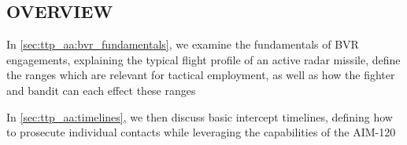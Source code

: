 \clearpage

\subsection{OVERVIEW}
\begin{tcoloritemize}
    \blueitem[Fundamentals] 
    In \cref{sec:ttp_aa:bvr_fundamentals}, 
    we examine the fundamentals of BVR engagements, 
    explaining the typical flight profile of an active radar missile,
    define the ranges which are relevant for tactical employment,
    as well as how the fighter and bandit can each effect these ranges

    In \cref{sec:ttp_aa:timelines}, 
    we then discuss basic intercept timelines, 
    defining how to prosecute individual contacts while leveraging the capabilities of the AIM-120


\end{tcoloritemize}

\clearpage